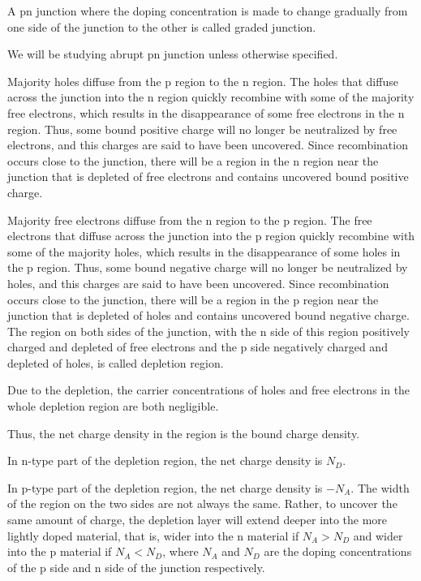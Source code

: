 \documentclass[a4paper,12pt]{report}
\begin{document}
A pn junction where the doping concentration is made to change gradually from one side of the junction to the other is called graded junction.

We will be studying abrupt pn junction unless otherwise specified.
\bit
\item Majority holes diffuse from the p region to the n region. The holes that diffuse across the junction into the n region quickly recombine with some of the majority free electrons, which results in the disappearance of some free electrons in the n region. Thus, some bound positive charge will no longer be neutralized by free electrons, and this charges are said to have been uncovered. Since recombination occurs close to the junction, there will be a region in the n region near the junction that is depleted of free electrons and contains uncovered bound positive charge.
\item Majority free electrons diffuse from the n region to the p region. The free electrons that diffuse across the junction into the p region quickly recombine with some of the majority holes, which results in the disappearance of some holes in the p region. Thus, some bound negative charge will no longer be neutralized by holes, and this charges are said to have been uncovered. Since recombination occurs close to the junction, there will be a region in the p region near the junction that is depleted of holes and contains uncovered bound negative charge.
\eit
The region on both sides of the junction, with the n side of this region positively charged and depleted of free electrons and the p side negatively charged and depleted of holes, is called depletion region.

Due to the depletion, the carrier concentrations of holes and free electrons in the whole depletion region are both negligible.

Thus, the net charge density in the region is the bound charge density.
\bit
\item In n-type part of the depletion region, the net charge density is $N_D$.
\item In p-type part of the depletion region, the net charge density is $-N_A$.
\eit
The width of the region on the two sides are not always the same. Rather, to uncover the same amount of charge, the depletion layer will extend deeper into the more lightly doped material, that is, wider into the n material if $N_A>N_D$ and wider into the p material if $N_A<N_D$, where $N_A$ and $N_D$ are the doping concentrations of the p side and n side of the junction respectively.
\end{document}
